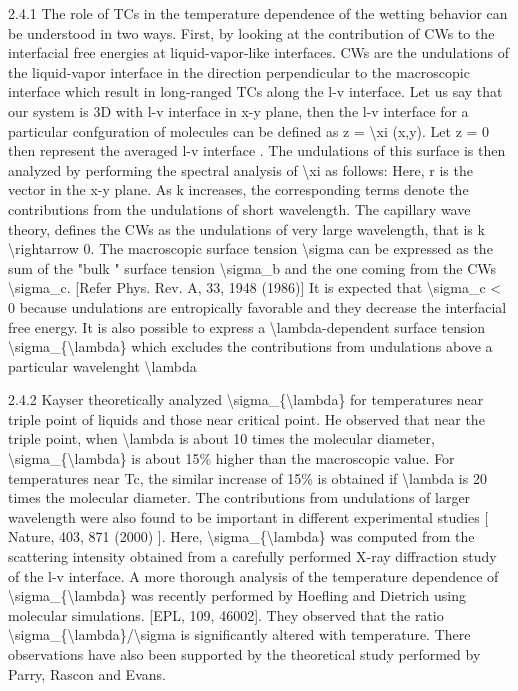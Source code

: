 \par 2.4.1 The role of TCs in the temperature dependence of the wetting behavior can be understood in two ways. First, by looking at the contribution of CWs to the interfacial free energies at liquid-vapor-like interfaces. CWs are the undulations of the liquid-vapor interface in the direction perpendicular to the macroscopic interface which result in long-ranged TCs along the l-v interface. Let us say that our system is 3D with l-v interface in x-y plane, then the l-v interface for a particular confguration of molecules can be defined as z = \textbackslash xi (x,y). Let z = 0 then represent the averaged l-v interface . The undulations of this surface is then analyzed by performing the spectral analysis of \textbackslash xi as follows: Here, r is the vector  in the x-y plane. As k increases, the corresponding terms denote the contributions from the undulations of short wavelength. The capillary wave theory, defines the CWs as the undulations of very large wavelength, that is k \textbackslash rightarrow 0. The macroscopic surface tension  \textbackslash sigma can be expressed as the sum of the "bulk " surface tension  \textbackslash sigma\_b and the one coming from the CWs \textbackslash sigma\_c. [Refer Phys. Rev. A, 33, 1948 (1986)] It is expected that \textbackslash sigma\_c < 0 because undulations are entropically favorable and they decrease the interfacial free energy.  It is also possible to express a \textbackslash lambda-dependent surface tension \textbackslash sigma\_\{\textbackslash lambda\} which excludes the contributions from undulations above a particular wavelenght \textbackslash lambda
\par 2.4.2 Kayser theoretically analyzed \textbackslash sigma\_\{\textbackslash lambda\} for temperatures near triple point of liquids and those near critical point. He observed that near the triple point, when \textbackslash lambda is about 10 times the molecular diameter, \textbackslash sigma\_\{\textbackslash lambda\} is about 15\% higher than the macroscopic value. For temperatures near Tc, the similar increase of 15\% is obtained if \textbackslash lambda is 20 times the molecular diameter. The contributions from undulations of larger wavelength were also found to be important in different experimental studies [ Nature, 403, 871 (2000) ]. Here, \textbackslash sigma\_\{\textbackslash lambda\} was computed from the scattering intensity obtained from a carefully performed X-ray diffraction study of the l-v interface. A more thorough analysis of the temperature dependence of \textbackslash sigma\_\{\textbackslash lambda\} was recently performed by Hoefling and Dietrich using molecular simulations. [EPL, 109, 46002]. They observed that the ratio \textbackslash sigma\_\{\textbackslash lambda\}/\textbackslash sigma is significantly altered with temperature. There observations have also been supported by the theoretical study performed by Parry, Rascon and Evans.
